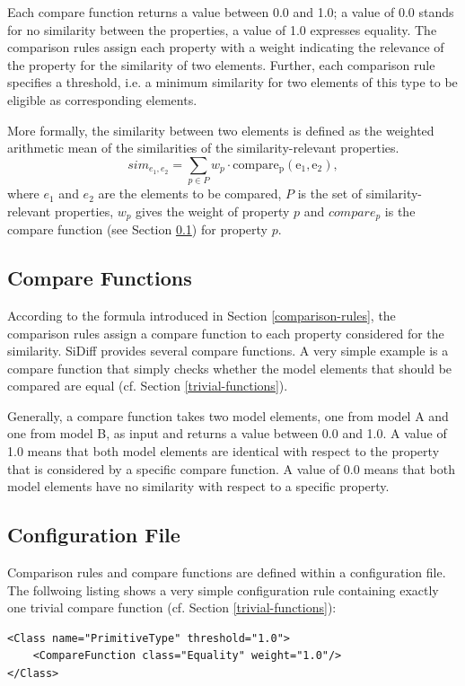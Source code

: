 \documentclass[10pt,a4paper]{scrartcl}
\begin{document}
Each compare function returns a value between 0.0 and 1.0; a value of 0.0 stands for no similarity
between the properties, a value of 1.0 expresses equality. The comparison rules assign each property
with a weight indicating the relevance of the property for the similarity of two elements.
Further, each comparison rule specifies a threshold, i.e. a minimum similarity for two elements of
this type to be eligible as corresponding elements.

More formally, the similarity between two elements is defined as the weighted arithmetic mean of the
similarities of the similarity-relevant properties.
\[ sim_{e_1,e_2} = \sum_{p \in P} w_p \cdot \mathrm{compare_p(e_1, e_2)}, \]
where $e_1$ and $e_2$ are the elements to be compared, $P$ is the set of
similarity-relevant properties, $w_p$ gives the weight of property $p$ and
$compare_p$ is the compare function (see Section \ref{compare-functions}) for property $p$. 

\subsection{Compare Functions}
\label{compare-functions}
According to the formula introduced in Section \ref{comparison-rules}, the comparison rules assign
a compare function to each property considered for the similarity. SiDiff provides several compare
functions. A very simple example is a compare function that simply checks whether the model elements
that should be compared are equal (cf. Section \ref{trivial-functions}).

Generally, a compare function takes two model elements, one from model A and one from model B, as
input and returns a value between 0.0 and 1.0. A value of 1.0 means that both model elements are 
identical with respect to the property that is considered by a specific compare function. A value
of 0.0 means that both model elements have no similarity with respect to a specific property.


\subsection{Configuration File}
Comparison rules and compare functions are defined within a configuration file. The follwoing listing
shows a very simple configuration rule containing exactly one trivial compare function (cf. Section 
\ref{trivial-functions}):

\begin{lstlisting}
<Class name="PrimitiveType" threshold="1.0">
	<CompareFunction class="Equality" weight="1.0"/>
</Class>
\end{lstlisting}
\end{document}
